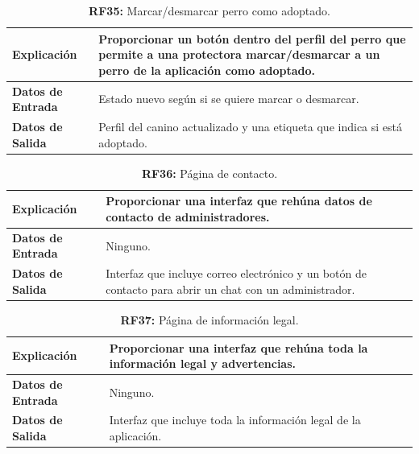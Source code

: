 \documentclass[a4paper, 12pt]{article}
\begin{document}
\begin{table}[H]
\captionsetup{justification=raggedright,singlelinecheck=false}
\caption{\textbf{RF35:} Marcar/desmarcar perro como adoptado.}
\label{tab:RF35}
	\begin{tabular}{|m{5cm}|m{10cm}|}
	\hline
	\textbf{Explicación} & Proporcionar un botón dentro del perfil del perro que permite a una protectora marcar/desmarcar a un perro de la aplicación como adoptado. \\ 
	\hline
	\textbf{Datos de Entrada} & Estado nuevo según si se quiere marcar o desmarcar. \\ 
	\hline
	\textbf{Datos de Salida} & Perfil del canino actualizado y una etiqueta que indica si está adoptado. \\ 
	\hline
\end{tabular}
\end{table}


\begin{table}[H]
\captionsetup{justification=raggedright,singlelinecheck=false}
\caption{\textbf{RF36:} Página de contacto.}
\label{tab:RF36}
	\begin{tabular}{|m{5cm}|m{10cm}|}
	\hline
	\textbf{Explicación} & Proporcionar una interfaz que rehúna datos de contacto de administradores. \\ 
	\hline
	\textbf{Datos de Entrada} & Ninguno. \\ 
	\hline
	\textbf{Datos de Salida} & Interfaz que incluye correo electrónico y un botón de contacto para abrir un chat con un administrador. \\ 
	\hline
\end{tabular}
\end{table}

\begin{table}[H]
\captionsetup{justification=raggedright,singlelinecheck=false}
\caption{\textbf{RF37:} Página de información legal.}
\label{tab:RF37}
	\begin{tabular}{|m{5cm}|m{10cm}|}
	\hline
	\textbf{Explicación} & Proporcionar una interfaz que rehúna toda la información legal y advertencias. \\ 
	\hline
	\textbf{Datos de Entrada} & Ninguno. \\ 
	\hline
	\textbf{Datos de Salida} & Interfaz que incluye toda la información legal de la aplicación. \\ 
	\hline
\end{tabular}
\end{table}
\end{document}
